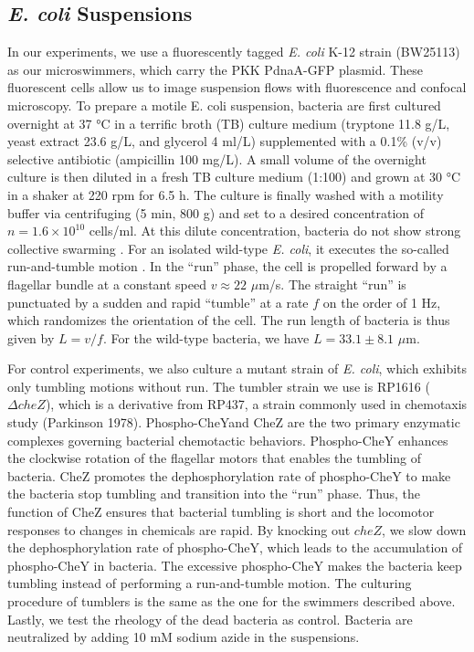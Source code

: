 \subsection{\textit{E. coli} Suspensions}
In our experiments, we use a fluorescently tagged \textit{E. coli} K-12 strain (BW25113) as our microswimmers, which carry the
PKK PdnaA-GFP plasmid. These fluorescent cells allow us to image suspension flows with fluorescence and confocal microscopy. To prepare a motile E. coli suspension, bacteria are first cultured overnight at 37 °C in a terrific broth (TB) culture medium (tryptone 11.8 g/L, yeast extract 23.6 g/L, and glycerol 4 ml/L) supplemented with a 0.1\% (v/v) selective antibiotic (ampicillin 100 mg/L). A small volume of the overnight culture is then diluted in a fresh TB culture medium (1:100) and grown at 30 °C in a shaker at 220 rpm for 6.5 h. The culture is finally washed with a motility buffer via centrifuging (5 min, 800 g) and set to a desired concentration of $n = 1.6 \times 10^{10}$ cells/ml. At this dilute concentration, bacteria do not show strong collective swarming \cite{Guo2018}. For an isolated wild-type \textit{E. coli}, it executes the so-called run-and-tumble motion \cite{Berg2004}. In the ``run'' phase, the cell is propelled forward by a flagellar bundle at a constant speed $v \approx 22$ $\mu$m/s. The straight ``run'' is punctuated by a sudden and rapid ``tumble'' at a rate $f$ on the order of 1 Hz, which randomizes the orientation of the cell. The run length of bacteria
is thus given by $L = v/f$. For the wild-type bacteria, we have $L = 33.1 \pm 8.1$ $\mu$m.

For control experiments, we also culture a mutant strain of \textit{E. coli}, which exhibits only tumbling motions without run. The tumbler strain we use is RP1616 ($\Delta cheZ$), which is a derivative from RP437, a strain commonly used in chemotaxis study \cite{Parkinson1978} (Parkinson 1978). Phospho-CheYand CheZ are the two primary enzymatic complexes governing bacterial chemotactic behaviors. Phospho-CheY enhances the clockwise rotation of the flagellar motors that enables the tumbling of bacteria. CheZ promotes the dephosphorylation rate of phospho-CheY to make the bacteria stop tumbling and transition into the ``run'' phase. Thus, the function of CheZ ensures that bacterial tumbling is short and the locomotor responses to changes in chemicals are rapid. By knocking out $cheZ$, we slow down the dephosphorylation rate of phospho-CheY, which leads to the accumulation of phospho-CheY in bacteria. The excessive phospho-CheY makes the bacteria keep tumbling instead of performing a run-and-tumble motion. The culturing procedure of tumblers is the same as the one for the swimmers described above. Lastly, we test the rheology of the dead bacteria as control. Bacteria are neutralized by adding 10 mM sodium azide in the suspensions.

